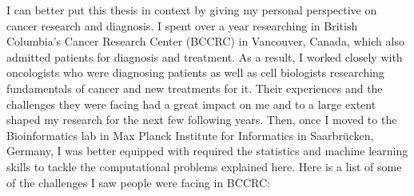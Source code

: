 I can better put this thesis in context by giving my personal perspective on
cancer research and diagnosis. I spent over a year researching in British
Columbia's Cancer Research Center (BCCRC) in Vancouver, Canada, which also
admitted patients for diagnosis and treatment. As a result, I worked closely
with oncologists who were diagnosing patients as well as cell biologists
researching fundamentals of cancer and new treatments for it. Their experiences
and the challenges they were facing had a great impact on me and to a large
extent shaped my research for the next few following years. Then, once I moved
to the Bioinformatics lab in Max Planck Institute for Informatics in
Saarbr\"ucken, Germany, I was better equipped with required the statistics and
machine learning skills to tackle the computational problems explained here.
Here is a list of some of the challenges I saw people were facing in BCCRC:


